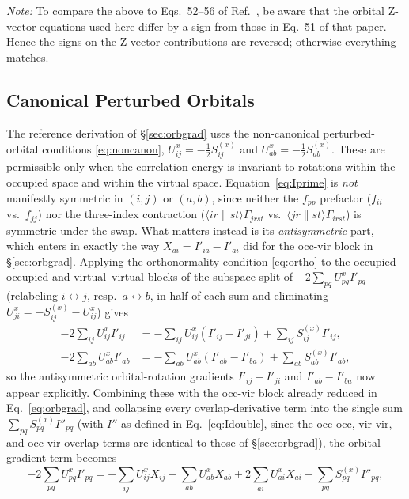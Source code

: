 \documentclass[12pt]{article}
\newcommand{\adb}[2]{\langle #1 \| #2 \rangle}
\begin{document}
\noindent
{\em Note:} To compare the above to Eqs.~52--56 of Ref.~,
be aware that the orbital Z-vector equations used here differ by a sign from
those in Eq.~51 of that paper.  Hence the signs on the Z-vector contributions
are reversed; otherwise everything matches.

\subsection{Canonical Perturbed Orbitals}
\label{sec:canon-mo}

The reference derivation of \S\ref{sec:orbgrad} uses the non-canonical perturbed-orbital
conditions \eqref{eq:noncanon}, $U^x_{ij}=-\tfrac12 S^{(x)}_{ij}$ and
$U^x_{ab}=-\tfrac12 S^{(x)}_{ab}$.  These are permissible only when the correlation
energy is invariant to rotations within the occupied space and within the
virtual space.  Equation~\eqref{eq:Iprime} is {\em not} manifestly symmetric in
$(i,j)$ or $(a,b)$, since neither the $f_{pp}$ prefactor ($f_{ii}$ vs.\ $f_{jj}$) nor
the three-index contraction ($\adb{ir}{st}\Gamma_{jrst}$ vs.\
$\adb{jr}{st}\Gamma_{irst}$) is symmetric under the swap.  What matters instead is
its {\em antisymmetric} part, which enters in exactly the way
$X_{ai}=I'_{ia}-I'_{ai}$ did for the occ-vir block in \S\ref{sec:orbgrad}.  Applying the
orthonormality condition \eqref{eq:ortho} to the occupied--occupied and
virtual--virtual blocks of the subspace split of $-2\sum_{pq}U^x_{pq}I'_{pq}$
(relabeling $i\leftrightarrow j$, resp.\ $a\leftrightarrow b$, in half of each
sum and eliminating $U^x_{ji}=-S^{(x)}_{ij}-U^x_{ij}$) gives
\begin{align}
-2\sum_{ij}U^x_{ij}I'_{ij}
&= -\sum_{ij}U^x_{ij}\left(I'_{ij}-I'_{ji}\right) + \sum_{ij}S^{(x)}_{ij}I'_{ij},
\label{eq:orbgrad-oo}\\
-2\sum_{ab}U^x_{ab}I'_{ab}
&= -\sum_{ab}U^x_{ab}\left(I'_{ab}-I'_{ba}\right) + \sum_{ab}S^{(x)}_{ab}I'_{ab},
\label{eq:orbgrad-vv}
\end{align}
so the antisymmetric orbital-rotation gradients $I'_{ij}-I'_{ji}$ and
$I'_{ab}-I'_{ba}$ now appear explicitly.  Combining these with the occ-vir block
already reduced in Eq.~\eqref{eq:orbgrad}, and collapsing every overlap-derivative
term into the single sum $\sum_{pq}S^{(x)}_{pq}I''_{pq}$ (with $I''$ as defined in
Eq.~\eqref{eq:Idouble}, since the occ-occ, vir-vir, and occ-vir overlap terms are identical to
those of \S\ref{sec:orbgrad}), the orbital-gradient term becomes
\begin{equation}
-2\sum_{pq}U^x_{pq}I'_{pq}
= -\sum_{ij}U^x_{ij} X_{ij}
- \sum_{ab}U^x_{ab} X_{ab}
+ 2\sum_{ai}U^x_{ai} X_{ai} 
+ \sum_{pq}S^{(x)}_{pq}I''_{pq},
\label{eq:orbgrad-canon-full}
\end{equation}
\end{document}
